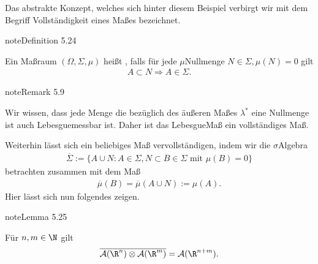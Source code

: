 \documentclass[letterpaper,10pt,german]{jupyterBook}
\begin{document}
\sphinxAtStartPar
Das abstrakte Konzept, welches sich hinter diesem Beispiel verbirgt wir mit dem Begriff Vollständigkeit eines Maßes bezeichnet.
\label{masstheorie/integrationstechnik:definition-3}
\begin{sphinxadmonition}{note}{Definition 5.24}



\sphinxAtStartPar
Ein Maßraum \((\Omega,\Sigma,\mu)\) heißt , falls für jede \(\mu\)\sphinxhyphen{}Nullmenge \(N\in\Sigma, \mu(N)=0\) gilt
\begin{equation*}
\begin{split}A\subset N \Rightarrow A\in \Sigma.\end{split}
\end{equation*}\end{sphinxadmonition}
\label{masstheorie/integrationstechnik:remark-4}
\begin{sphinxadmonition}{note}{Remark 5.9}



\sphinxAtStartPar
Wir wissen, dass jede Menge die bezüglich des äußeren Maßes \(\lambda^\ast\) eine Nullmenge ist auch Lebesgue\sphinxhyphen{}messbar ist. Daher ist das Lebesgue\sphinxhyphen{}Maß ein vollständiges Maß.
\end{sphinxadmonition}

\sphinxAtStartPar
Weiterhin lässt sich ein beliebiges Maß vervollständigen, indem wir die \(\sigma\)\sphinxhyphen{}Algebra
\begin{equation*}
\begin{split}\overline{\Sigma}:=\{A\cup N: A\in\Sigma, N\subset B\in\Sigma\text{ mit }\mu(B)=0\}\end{split}
\end{equation*}
\sphinxAtStartPar
betrachten zusammen mit dem Maß
\begin{equation*}
\begin{split}\overline{\mu}(B)= \overline{\mu}(A\cup N):= \mu(A).\end{split}
\end{equation*}
\sphinxAtStartPar
Hier lässt sich nun folgendes zeigen.
\label{masstheorie/integrationstechnik:lem:completelebesgue}
\begin{sphinxadmonition}{note}{Lemma 5.25}



\sphinxAtStartPar
Für \(n,m\in\N\) gilt
\begin{equation*}
\begin{split}\overline{\mathcal{A}(\R^n)\otimes\mathcal{A}(\R^m)}= \mathcal{A}(\R^{n+m}).\end{split}
\end{equation*}\end{sphinxadmonition}
\end{document}
